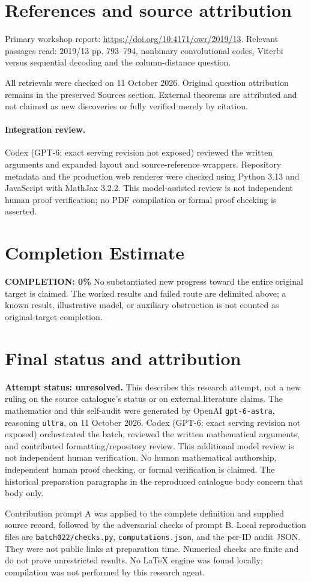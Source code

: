 \documentclass[11pt]{article}
\begin{document}
\section{References and source attribution}
Primary workshop report: \url{https://doi.org/10.4171/owr/2019/13}. Relevant passages read: 2019/13 pp. 793--794, nonbinary convolutional codes, Viterbi versus sequential decoding and the column-distance question.

All retrievals were checked on 11 October 2026. Original question attribution remains in the preserved Sources section. External theorems are attributed and not claimed as new discoveries or fully verified merely by citation.


\paragraph{Integration review.} Codex (GPT-6; exact serving revision not exposed) reviewed the written arguments and expanded layout and source-reference wrappers. Repository metadata and the production web renderer were checked using Python 3.13 and JavaScript with MathJax 3.2.2. This model-assisted review is not independent human proof verification; no PDF compilation or formal proof checking is asserted.

\section{Completion Estimate}
\noindent\textbf{COMPLETION: 0\%}
No substantiated new progress toward the entire original target is claimed. The worked results and failed route are delimited above; a known result, illustrative model, or auxiliary obstruction is not counted as original-target completion.

\section{Final status and attribution}
\textbf{Attempt status: unresolved.} This describes this research attempt, not a new ruling on the source catalogue's status or on external literature claims.
The mathematics and this self-audit were generated by OpenAI \texttt{gpt-6-astra}, reasoning \texttt{ultra}, on 11 October 2026. Codex (GPT-6; exact serving revision not exposed) orchestrated the batch, reviewed the written mathematical arguments, and contributed formatting/repository review. This additional model review is not independent human verification. No human mathematical authorship, independent human proof checking, or formal verification is claimed. The historical preparation paragraphs in the reproduced catalogue body concern that body only.

Contribution prompt A was applied to the complete definition and supplied source record, followed by the adversarial checks of prompt B. Local reproduction files are \texttt{batch022/checks.py}, \texttt{computations.json}, and the per-ID audit JSON. They were not public links at preparation time. Numerical checks are finite and do not prove unrestricted results. No LaTeX engine was found locally; compilation was not performed by this research agent.
\end{document}
